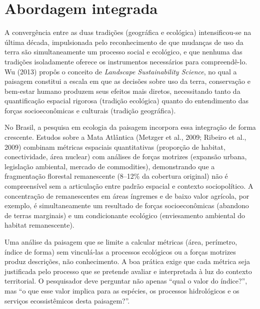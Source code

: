 \documentclass[
  portuguese,
  11pt,
  a4paper,
  open=any]{scrbook}
\begin{document}
\section{Abordagem integrada}\label{abordagem-integrada}

A convergência entre as duas tradições (geográfica e ecológica)
intensificou-se na última década, impulsionada pelo reconhecimento de
que mudanças de uso da terra são simultaneamente um processo social e
ecológico, e que nenhuma das tradições isoladamente oferece os
instrumentos necessários para compreendê-lo. Wu (2013) propôs o conceito
de \emph{Landscape Sustainability Science}, no qual a paisagem constitui
a escala em que as decisões sobre uso da terra, conservação e bem-estar
humano produzem seus efeitos mais diretos, necessitando tanto da
quantificação espacial rigorosa (tradição ecológica) quanto do
entendimento das forças socioeconômicas e culturais (tradição
geográfica).

No Brasil, a pesquisa em ecologia da paisagem incorpora essa integração
de forma crescente. Estudos sobre a Mata Atlântica (Metzger et al.,
2009; Ribeiro et al., 2009) combinam métricas espaciais quantitativas
(proporção de habitat, conectividade, área nuclear) com análises de
forças motrizes (expansão urbana, legislação ambiental, mercado de
commodities), demonstrando que a fragmentação florestal remanescente
(8--12\% da cobertura original) não é compreensível sem a articulação
entre padrão espacial e contexto sociopolítico. A concentração de
remanescentes em áreas íngremes e de baixo valor agrícola, por exemplo,
é simultaneamente um resultado de forças socioeconômicas (abandono de
terras marginais) e um condicionante ecológico (enviesamento ambiental
do habitat remanescente).

\begin{tcolorbox}[enhanced jigsaw, colbacktitle=quarto-callout-tip-color!10!white, coltitle=black, opacityback=0, breakable, left=2mm, colback=white, bottomtitle=1mm, toptitle=1mm, titlerule=0mm, arc=.35mm, opacitybacktitle=0.6, leftrule=.75mm, colframe=quarto-callout-tip-color-frame, title=\textcolor{quarto-callout-tip-color}{\faLightbulb}\hspace{0.5em}{Integração na prática}, rightrule=.15mm, bottomrule=.15mm, toprule=.15mm]

Uma análise da paisagem que se limite a calcular métricas (área,
perímetro, índice de forma) sem vinculá-las a processos ecológicos ou a
forças motrizes produz descrições, não conhecimento. A boa prática exige
que cada métrica seja justificada pelo processo que se pretende avaliar
e interpretada à luz do contexto territorial. O pesquisador deve
perguntar não apenas ``qual o valor do índice?'', mas ``o que esse valor
implica para as espécies, os processos hidrológicos e os serviços
ecossistêmicos desta paisagem?''.

\end{tcolorbox}
\end{document}
